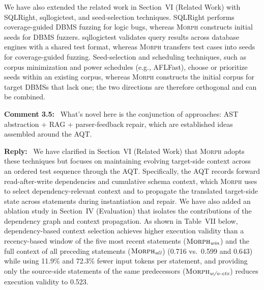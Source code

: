 \documentclass[12pt,letterpaper]{article}
\newcommand{\morph}{\textsc{Morph}}
\newcommand{\tool}{\morph}
\newcommand{\reviewstart}{\par\addvspace{0.85\baselineskip}\Needspace{4\baselineskip}\noindent}
\newcounter{commentanchor}
\newcommand{\reviewcomment}[1]{\reviewstart\renewcommand{\thecommentanchor}{#1}\refstepcounter{commentanchor}\label{comment:#1}\textbf{Comment #1:}\ }
\newcommand{\reply}{\par\nobreak\noindent\textbf{Reply:}\ }
\begin{document}
We have also extended the related work in Section~VI (Related Work) with SQLRight, sqllogictest, and seed-selection techniques. SQLRight performs coverage-guided DBMS fuzzing for logic bugs, whereas \tool{} constructs initial seeds for DBMS fuzzers. sqllogictest validates query results across database engines with a shared test format, whereas \tool{} transfers test cases into seeds for coverage-guided fuzzing. Seed-selection and scheduling techniques, such as corpus minimization and power schedules (e.g., AFLFast), choose or prioritize seeds within an existing corpus, whereas \tool{} constructs the initial corpus for target DBMSs that lack one; the two directions are therefore orthogonal and can be combined.

\reviewcomment{3.5} What's novel here is the conjunction of approaches: AST abstraction + RAG + parser-feedback repair, which are established ideas assembled around the AQT.

\reply
We have clarified in Section~VI (Related Work) that \tool{} adopts these techniques but focuses on maintaining evolving target-side context across an ordered test sequence through the AQT. Specifically, the AQT records forward read-after-write dependencies and cumulative schema context, which \tool{} uses to select dependency-relevant context and to propagate the translated target-side state across statements during instantiation and repair. We have also added an ablation study in Section~IV (Evaluation) that isolates the contributions of the dependency graph and context propagation. As shown in Table~VII below, dependency-based context selection achieves higher execution validity than a recency-based window of the five most recent statements ($\tool{}_{\textit{win}}$) and the full context of all preceding statements ($\tool{}_{\textit{all}}$) (0.716 vs.\ 0.599 and 0.643) while using 11.9\% and 72.3\% fewer input tokens per statement, and providing only the source-side statements of the same predecessors ($\tool{}_{\textit{w/o-ctx}}$) reduces execution validity to 0.523.
\end{document}
